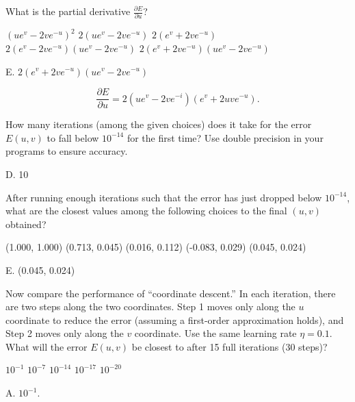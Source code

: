 \documentclass[answers]{exam}
\begin{document}
\begin{questions}
\setcounter{question}{3}

\question 
What is the partial derivative \( \frac{\partial E}{\partial u} \)?

\begin{choices}
    \choice \( (u e^v - 2 v e^{-u})^2 \)
    \choice \( 2 (u e^v - 2 v e^{-u}) \)
    \choice \( 2 (e^v + 2 v e^{-u}) \)
    \choice \( 2 (e^v - 2 v e^{-u}) (u e^v - 2 v e^{-u}) \)
    \choice \( 2 (e^v + 2 v e^{-u}) (u e^v - 2 v e^{-u}) \)
\end{choices}

\begin{solution}
E. \( 2 (e^v + 2 v e^{-u}) (u e^v - 2 v e^{-u}) \)

\[
\frac{\partial E}{\partial u} = 2(ue^{v} - 2ve^{-i})(e^{v} + 2uve^{-u})
.\] 
\end{solution}

\question How many iterations (among the given choices) does it take for the 
error \( E(u, v) \) to fall below \( 10^{-14} \) for the first time? Use double 
precision in your programs to ensure accuracy.

\begin{choices}
\end{choices}

\begin{solution}
D. 10
\end{solution}

\question After running enough iterations such that the error has just dropped below 
\( 10^{-14} \), what are the closest values among the following choices to the final 
\( (u, v) \) obtained?

\begin{choices}
    \choice (1.000, 1.000)
    \choice (0.713, 0.045)
    \choice (0.016, 0.112)
    \choice (-0.083, 0.029)
    \choice (0.045, 0.024)
\end{choices}

\begin{solution}
E. (0.045, 0.024)
\end{solution}

\question Now compare the performance of “coordinate descent.” In each iteration, 
there are two steps along the two coordinates. Step 1 moves only along the \( u \) 
coordinate to reduce the error (assuming a first-order approximation holds), and 
Step 2 moves only along the \( v \) coordinate. Use the same learning rate \( \eta = 0.1 \). 
What will the error \( E(u, v) \) be closest to after 15 full iterations (30 steps)?

\begin{choices}
    \choice \( 10^{-1} \)
    \choice \( 10^{-7} \)
    \choice \( 10^{-14} \)
    \choice \( 10^{-17} \)
    \choice \( 10^{-20} \)
\end{choices}

\begin{solution}
A. $10^{-1}$.
\end{solution}
\end{questions}
\end{document}

